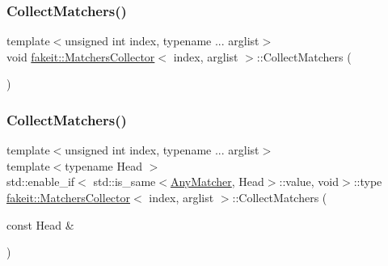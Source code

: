 \mbox{\label{classfakeit_1_1MatchersCollector_a2d9a08a347c3915daa33f307a274f13c}} 
\subsubsection{\texorpdfstring{CollectMatchers()}{CollectMatchers()}\hspace{0.1cm}{\footnotesize\ttfamily [42/63]}}
{\footnotesize\ttfamily template$<$unsigned int index, typename ... arglist$>$ \\
void \mbox{\hyperlink{classfakeit_1_1MatchersCollector}{fakeit\+::\+Matchers\+Collector}}$<$ index, arglist $>$\+::Collect\+Matchers (\begin{DoxyParamCaption}{ }\end{DoxyParamCaption})\hspace{0.3cm}{\ttfamily [inline]}}

\mbox{\label{classfakeit_1_1MatchersCollector_a89350af9ba2e7aaead8bd7b007f03631}} 
\subsubsection{\texorpdfstring{CollectMatchers()}{CollectMatchers()}\hspace{0.1cm}{\footnotesize\ttfamily [43/63]}}
{\footnotesize\ttfamily template$<$unsigned int index, typename ... arglist$>$ \\
template$<$typename Head $>$ \\
std\+::enable\+\_\+if$<$ std\+::is\+\_\+same$<$\mbox{\hyperlink{structfakeit_1_1AnyMatcher}{Any\+Matcher}}, Head$>$\+::value, void$>$\+::type \mbox{\hyperlink{classfakeit_1_1MatchersCollector}{fakeit\+::\+Matchers\+Collector}}$<$ index, arglist $>$\+::Collect\+Matchers (\begin{DoxyParamCaption}\item[{const Head \&}]{ }\end{DoxyParamCaption})\hspace{0.3cm}{\ttfamily [inline]}}

